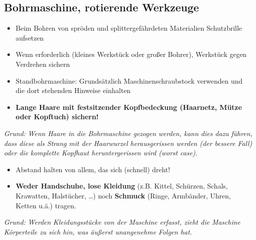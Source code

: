 \documentclass[13pt]{\basedir/fablab-document}
\begin{document}
\subsection{Bohrmaschine, rotierende Werkzeuge}



\begin{itemize}
	\item Beim Bohren von spröden und splittergefährdeten Materialien Schutzbrille aufsetzen
	\item Wenn erforderlich (kleines Werkstück oder großer Bohrer), Werkstück gegen Verdrehen sichern
	\item Standbohrmaschine: Grundsätzlich Maschinenschraubstock verwenden und die dort stehenden Hinweise einhalten
	\item \textbf{Lange Haare mit festsitzender Kopfbedeckung (Haarnetz, Mütze oder Kopftuch) sichern!}
\end{itemize}
\textit{Grund: Wenn Haare in die Bohrmaschine gezogen werden, kann dies dazu führen, dass diese als Strang mit der Haarwurzel herausgerissen werden (der bessere Fall) oder die komplette Kopfhaut heruntergerissen wird (worst case).}

\begin{itemize}
	\item Abstand halten von allem, das sich (schnell) dreht!
	\item \textbf{Weder Handschuhe, lose Kleidung} (z.B. Kittel, Schürzen, Schals, Krawatten, Halstücher, \dots) noch \textbf{Schmuck} (Ringe, Arm\-bänder, Uhren, Ketten u.ä.) tragen.
\end{itemize}
\textit{Grund: Werden Kleidungsstücke von der Maschine erfasst, zieht die Maschine Körperteile zu sich hin, was äußerst unangenehme Folgen hat.}
\end{document}
